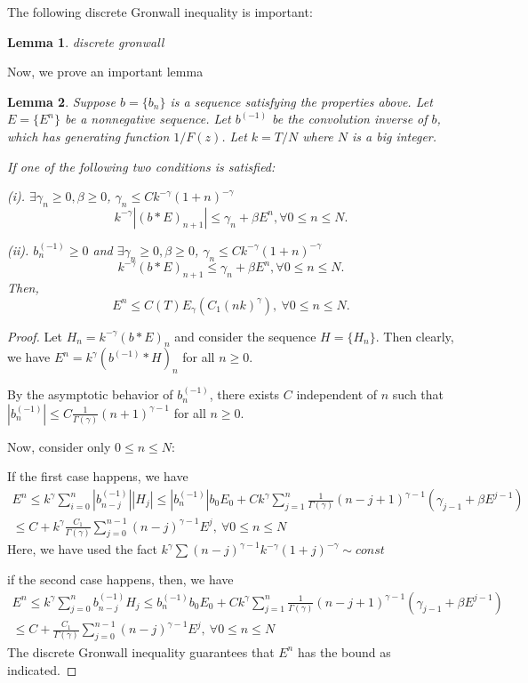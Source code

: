 \documentclass[11pt]{article}
\newtheorem{lmm}{Lemma}
\begin{document}
The following discrete Gronwall inequality is important:
\begin{lmm}
discrete gronwall
\end{lmm}

Now, we prove an important lemma
\begin{lmm}
Suppose $b=\{b_n\}$ is a sequence satisfying the properties above. Let $E=\{E^n\}$ be a nonnegative sequence. Let $b^{(-1)}$ be the convolution inverse of $b$, which has generating function $1/F(z)$. Let $k=T/N$ where $N$ is a big integer.

If one of the following two conditions is satisfied:

 (i). $\exists \gamma_n\ge 0,\beta\ge 0$, $\gamma_n\le Ck^{-\gamma}(1+n)^{-\gamma}$
 $$
k^{-\gamma}|(b*E)_{n+1}|\le \gamma_n+\beta E^n,\forall 0\le n\le N.
$$

(ii). $b^{(-1)}_n\ge 0$ and $\exists \gamma_n\ge0, \beta\ge0$, $\gamma_n\le Ck^{-\gamma}(1+n)^{-\gamma}$
$$
k^{-\gamma}(b*E)_{n+1}\le \gamma_n+\beta E^n,\forall 0\le n\le N.
$$
Then, $$
E^n\le C(T)E_{\gamma}(C_1(nk)^{\gamma}),\ \forall 0\le n\le N.
$$
\end{lmm}
\begin{proof}
Let $H_n=k^{-\gamma}(b*E)_{n}$ and consider the sequence $H=\{H_n\}$. Then clearly, we have $E^n=k^{\gamma}(b^{(-1)}*H)_n$ for all $n\ge 0$.

By the asymptotic behavior of $b^{(-1)}_n$, there exists $C$ independent of $n$ such that $|b^{(-1)}_n|\le C \frac{1}{\Gamma(\gamma)}(n+1)^{\gamma-1}$ for all $n\ge 0$.

Now, consider only $0\le n\le N$:

If the first case happens, we have 
\begin{gather*}
E^n\le k^{\gamma}\sum_{i=0}^n |b_{n-j}^{(-1)}| |H_{j}|
\le |b_n^{(-1)}|b_0E_0+Ck^{\gamma}\sum_{j=1}^{n} \frac{1}{\Gamma(\gamma)}(n-j+1)^{\gamma-1}
(\gamma_{j-1}+\beta E^{j-1})\\
\le C+k^{\gamma}\frac{C_1}{\Gamma(\gamma)}\sum_{j=0}^{n-1}(n-j)^{\gamma-1}E^j,\ \forall 0\le n\le N
\end{gather*}
Here, we have used the fact $k^{\gamma}\sum (n-j)^{\gamma-1}k^{-\gamma}(1+j)^{-\gamma}\sim const$

if the second case happens, then, we have 
\begin{gather*}
E^n\le k^{\gamma}\sum_{j=0}^n b_{n-j}^{(-1)} H_{j}
\le b_n^{(-1)}b_0E_0+Ck^{\gamma}\sum_{j=1}^{n} \frac{1}{\Gamma(\gamma)}(n-j+1)^{\gamma-1}
(\gamma_{j-1}+\beta E^{j-1})\\
\le C+\frac{C_1}{\Gamma(\gamma)}\sum_{j=0}^{n-1}(n-j)^{\gamma-1}E^j,\ \forall 0\le n\le N
\end{gather*}
The discrete Gronwall inequality guarantees that $E^n$ has the bound as indicated.
\end{proof}
\end{document}
